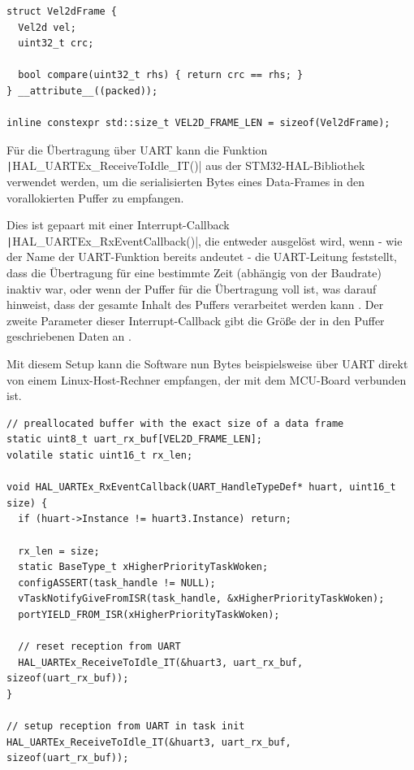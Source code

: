 \begin{code}
\begin{verbatim}
struct Vel2dFrame {
  Vel2d vel;
  uint32_t crc;

  bool compare(uint32_t rhs) { return crc == rhs; }
} __attribute__((packed));

inline constexpr std::size_t VEL2D_FRAME_LEN = sizeof(Vel2dFrame);
\end{verbatim}
\end{code}

Für die Übertragung über UART kann die Funktion
\texttt|HAL_UARTEx_ReceiveToIdle_IT()| aus der STM32-HAL-Bibliothek
verwendet werden, um die serialisierten Bytes eines Data-Frames in den
vorallokierten Puffer zu empfangen.

Dies ist gepaart mit einer Interrupt-Callback
\texttt|HAL_UARTEx_RxEventCallback()|, die entweder ausgelöst wird,
wenn - wie der Name der UART-Funktion bereits andeutet - die UART-Leitung
feststellt, dass die Übertragung für eine bestimmte Zeit (abhängig von der
Baudrate) inaktiv war, oder wenn der Puffer für die Übertragung voll ist, was
darauf hinweist, dass der gesamte Inhalt des Puffers verarbeitet werden kann
\cite{HAL_UARTEx_ReceiveToIdle_IT}. Der zweite Parameter dieser
Interrupt-Callback gibt die Größe der in den Puffer geschriebenen Daten an
\cite{HAL_UARTEx_RxEventCallback}.

Mit diesem Setup kann die Software nun Bytes beispielsweise über UART direkt von
einem Linux-Host-Rechner empfangen, der mit dem MCU-Board verbunden ist.

\begin{code}
\begin{verbatim}
// preallocated buffer with the exact size of a data frame
static uint8_t uart_rx_buf[VEL2D_FRAME_LEN];
volatile static uint16_t rx_len;

void HAL_UARTEx_RxEventCallback(UART_HandleTypeDef* huart, uint16_t size) {
  if (huart->Instance != huart3.Instance) return;

  rx_len = size;
  static BaseType_t xHigherPriorityTaskWoken;
  configASSERT(task_handle != NULL);
  vTaskNotifyGiveFromISR(task_handle, &xHigherPriorityTaskWoken);
  portYIELD_FROM_ISR(xHigherPriorityTaskWoken);

  // reset reception from UART
  HAL_UARTEx_ReceiveToIdle_IT(&huart3, uart_rx_buf, sizeof(uart_rx_buf));
}

// setup reception from UART in task init
HAL_UARTEx_ReceiveToIdle_IT(&huart3, uart_rx_buf, sizeof(uart_rx_buf));
\end{verbatim}
\end{code}

